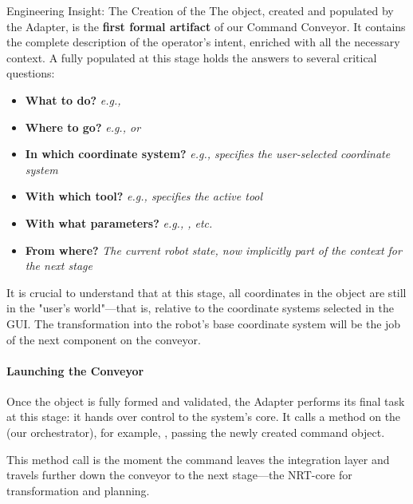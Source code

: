 \begin{tipbox}{Engineering Insight: The Creation of the }
\small
The  object, created and populated by the Adapter, is the \textbf{first formal artifact} of our Command Conveyor. It contains the complete description of the operator's intent, enriched with all the necessary context. A fully populated  at this stage holds the answers to several critical questions:
\begin{itemize}
    \item \textbf{What to do?} \hfill \textit{e.g., }
    \item \textbf{Where to go?} \hfill \textit{e.g.,  or }
    \item \textbf{In which coordinate system?} \hfill \textit{e.g.,  specifies the user-selected coordinate system}
    \item \textbf{With which tool?} \hfill \textit{e.g.,  specifies the active tool}
    \item \textbf{With what parameters?} \hfill \textit{e.g., , etc.}
    \item \textbf{From where?} \hfill \textit{The current robot state, now implicitly part of the context for the next stage}
\end{itemize}
It is crucial to understand that at this stage, all coordinates in the  object are still in the "user's world"—that is, relative to the coordinate systems selected in the GUI. The transformation into the robot's base coordinate system will be the job of the next component on the conveyor.
\end{tipbox}

\paragraph{Launching the Conveyor}
Once the  object is fully formed and validated, the Adapter performs its final task at this stage: it hands over control to the system's core. It calls a method on the  (our orchestrator), for example, , passing the newly created command object.

This method call is the moment the command leaves the integration layer and travels further down the conveyor to the next stage—the NRT-core for transformation and planning.

